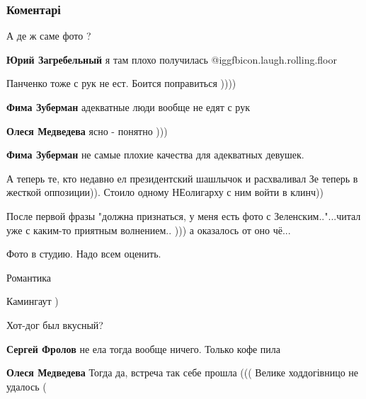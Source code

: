  
 
 
 
 
\subsubsection{Коментарі}

\begin{itemize} %
А де ж саме фото ?

\textbf{Юрий Загребельный} я там плохо получилась  @igg{fbicon.laugh.rolling.floor} 

Панченко тоже с рук не ест. Боится поправиться ))))

\begin{itemize} %
\textbf{Фима Зуберман} адекватные люди вообще не едят с рук

\textbf{Олеся Медведева} ясно - понятно )))

\textbf{Фима Зуберман} не самые плохие качества для адекватных девушек.
\end{itemize} %

А теперь те, кто недавно ел президентский шашлычок и расхваливал Зе теперь в жесткой оппозиции)). Стоило одному НЕолигарху с ним войти в клинч))

После первой фразы "должна признаться, у меня есть фото с Зеленским.."...читал уже с каким-то приятным волнением.. ))) а оказалось от оно чё...


Фото в студию. Надо всем оценить.

Романтика

Камингаут )

Хот-дог был вкусный?

\begin{itemize} %
\textbf{Сергей Фролов} не ела тогда вообще ничего. Только кофе пила

\textbf{Олеся Медведева} Тогда да, встреча так себе прошла ((( Велике ходдогівницо не удалось (


\end{itemize}
\end{itemize}

